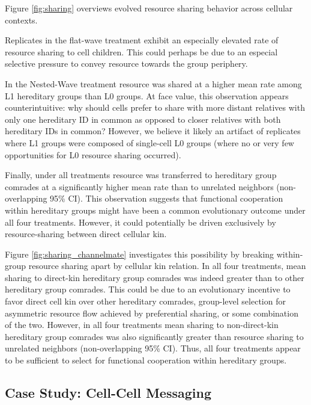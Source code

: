 


Figure \ref{fig:sharing} overviews evolved resource sharing behavior across cellular contexts.

Replicates in the flat-wave treatment exhibit an especially elevated rate of resource sharing to cell children.
This could perhaps be due to an especial selective pressure to convey resource towards the group periphery.

In the Nested-Wave treatment resource was shared at a higher mean rate among L1 hereditary groups than L0 groups.
At face value, this observation appears counterintuitive: why should cells prefer to share with more distant relatives with only one hereditary ID in common as opposed to closer relatives with both hereditary IDs in common?
However, we believe it likely an artifact of replicates where L1 groups were composed of single-cell L0 groups (where no or very few opportunities for L0 resource sharing occurred).

Finally, under all treatments resource was transferred to hereditary group comrades at a significantly higher mean rate than to unrelated neighbors (non-overlapping 95\% CI).
This observation suggests that functional cooperation within hereditary groups might have been a common evolutionary outcome under all four treatments.
However, it could potentially be driven exclusively by resource-sharing between direct cellular kin.

Figure \ref{fig:sharing_channelmate} investigates this possibility by breaking within-group resource sharing apart by cellular kin relation.
In all four treatments, mean sharing to direct-kin hereditary group comrades was indeed greater than to other hereditary group comrades.
This could be due to an evolutionary incentive to favor direct cell kin over other hereditary comrades, group-level selection for asymmetric resource flow achieved by preferential sharing, or some combination of the two.
However, in all four treatments mean sharing to non-direct-kin hereditary group comrades was also significantly greater than resource sharing to unrelated neighbors (non-overlapping 95\% CI).
Thus, all four treatments appear to be sufficient to select for functional cooperation within hereditary groups.

\subsection{Case Study: Cell-Cell Messaging} \label{sec:intergroup}

